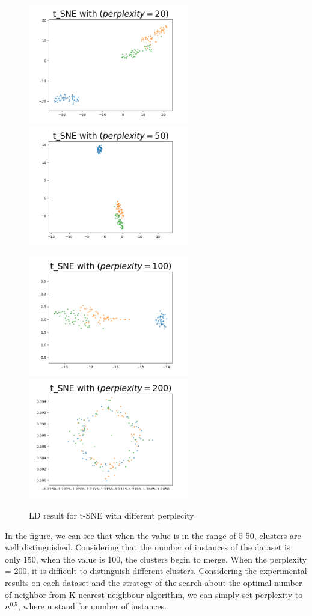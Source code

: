 \begin{figure}[H]
\centering  %
{
\label{Fig.sub.1}
\includegraphics[width=7cm,height=3.5cm\textwidth]{images/image_comparison_tsne_perp20.png}}
{
\label{Fig.sub.2}
\includegraphics[width=7cm,height=3.5cm\textwidth]{images/image_comparison_tsne_perp50.png}}

\centering  %
{
\label{Fig.sub.1}
\includegraphics[width=7cm,height=3.5cm\textwidth]{images/image_comparison_tsne_perp100.png}}
{
\label{Fig.sub.2}
\includegraphics[width=7cm,height=3.5cm\textwidth]{images/image_comparison_tsne_perp200.png}}
\caption{LD result for t-SNE with different perplecity}
\end{figure}


\noindent In the figure, we can see that when the value is in the range of 5-50, clusters are well distinguished. Considering that the number of instances of the dataset is only 150, when the value is 100, the clusters begin to merge. When the perplexity = 200, it is difficult to distinguish different clusters. Considering the experimental results on each dataset and the strategy of the search about the optimal number of neighbor from K nearest neighbour algorithm\cite{ref12}, we can simply set perplexity to $n^{0.5}$, where n stand for number of instances. \\

